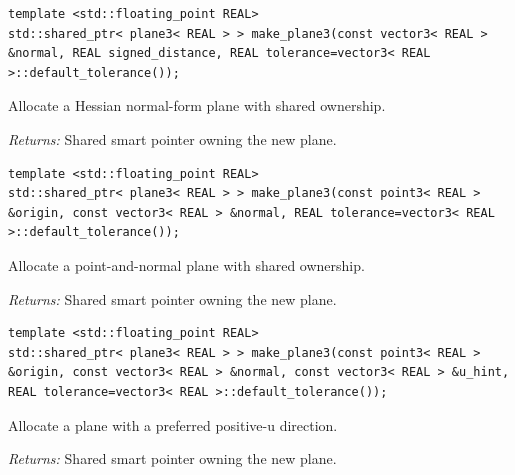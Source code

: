 \par\noindent\begin{minipage}{\linewidth}
\begin{lstlisting}[style=apireference]
template <std::floating_point REAL>
std::shared_ptr< plane3< REAL > > make_plane3(const vector3< REAL > &normal, REAL signed_distance, REAL tolerance=vector3< REAL >::default_tolerance());
\end{lstlisting}
{\footnotesize Allocate a Hessian normal-form plane with shared ownership.\par}
{\footnotesize\textit{Returns:} Shared smart pointer owning the new plane.\par}
\end{minipage}\par\vspace{1pt}
\par\noindent\begin{minipage}{\linewidth}
\begin{lstlisting}[style=apireference]
template <std::floating_point REAL>
std::shared_ptr< plane3< REAL > > make_plane3(const point3< REAL > &origin, const vector3< REAL > &normal, REAL tolerance=vector3< REAL >::default_tolerance());
\end{lstlisting}
{\footnotesize Allocate a point-and-normal plane with shared ownership.\par}
{\footnotesize\textit{Returns:} Shared smart pointer owning the new plane.\par}
\end{minipage}\par\vspace{1pt}
\par\noindent\begin{minipage}{\linewidth}
\begin{lstlisting}[style=apireference]
template <std::floating_point REAL>
std::shared_ptr< plane3< REAL > > make_plane3(const point3< REAL > &origin, const vector3< REAL > &normal, const vector3< REAL > &u_hint, REAL tolerance=vector3< REAL >::default_tolerance());
\end{lstlisting}
{\footnotesize Allocate a plane with a preferred positive-u direction.\par}
{\footnotesize\textit{Returns:} Shared smart pointer owning the new plane.\par}
\end{minipage}\par\vspace{1pt}
